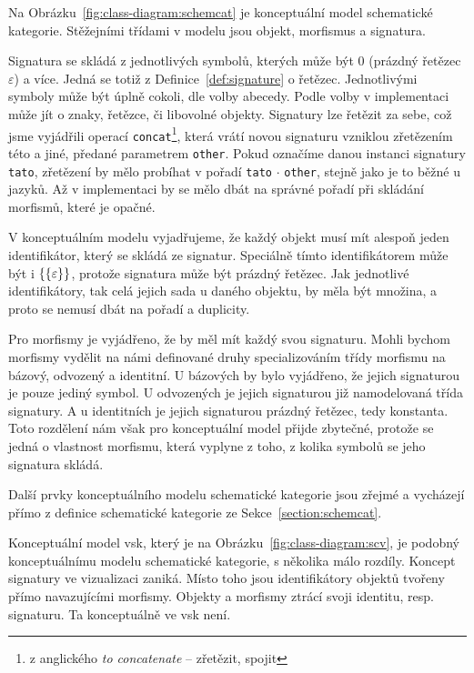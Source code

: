Na Obrázku~\ref{fig:class-diagram:schemcat} je konceptuální model schematické kategorie.
Stěžejními třídami v modelu jsou objekt, morfismus a signatura.

Signatura se skládá z jednotlivých symbolů, kterých může být 0 (prázdný řetězec $\varepsilon$) a více.
Jedná se totiž z Definice~\ref{def:signature} o řetězec.
Jednotlivými symboly může být úplně cokoli, dle volby abecedy.
Podle volby v implementaci může jít o znaky, řetězce, či libovolné objekty.
Signatury lze řetězit za sebe, což jsme vyjádřili operací \texttt{concat}\footnote{z anglického \emph{to concatenate} -- zřetězit, spojit},
která vrátí novou signaturu vzniklou zřetězením této a jiné, předané parametrem \texttt{other}.
Pokud označíme danou instanci signatury \texttt{tato}, zřetězení by mělo probíhat v pořadí \texttt{tato} $\cdot$ \texttt{other}, stejně jako je to běžné u jazyků.
Až v implementaci by se mělo dbát na správné pořadí při skládání morfismů, které je opačné.

V konceptuálním modelu vyjadřujeme, že každý objekt musí mít alespoň jeden identifikátor, který se skládá ze signatur.
Speciálně tímto identifikátorem může být i $\left\{\left\{\varepsilon\right\}\right\}$, protože signatura může být prázdný řetězec.
Jak jednotlivé identifikátory, tak celá jejich sada u daného objektu, by měla být množina, a proto se nemusí dbát na pořadí a duplicity.

Pro morfismy je vyjádřeno, že by měl mít každý svou signaturu.
Mohli bychom morfismy vydělit na námi definované druhy specializováním třídy morfismu na bázový, odvozený a identitní.
U bázových by bylo vyjádřeno, že jejich signaturou je pouze jediný symbol.
U odvozených je jejich signaturou již namodelovaná třída signatury.
A u identitních je jejich signaturou prázdný řetězec, tedy konstanta.
Toto rozdělení nám však pro konceptuální model přijde zbytečné, protože se jedná o vlastnost morfismu, která vyplyne z toho, z kolika symbolů se jeho signatura skládá.

Další prvky konceptuálního modelu schematické kategorie jsou zřejmé a vycházejí přímo z definice schematické kategorie ze Sekce~\ref{section:schemcat}.

Konceptuální model \acrfull{vsk}, který je na Obrázku~\ref{fig:class-diagram:scv}, je podobný konceptuálnímu modelu schematické kategorie, s několika málo rozdíly.
Koncept signatury ve vizualizaci zaniká.
Místo toho jsou identifikátory objektů tvořeny přímo navazujícími morfismy.
Objekty a morfismy ztrácí svoji identitu, resp. signaturu.
Ta konceptuálně ve \acrshort{vsk} není.

